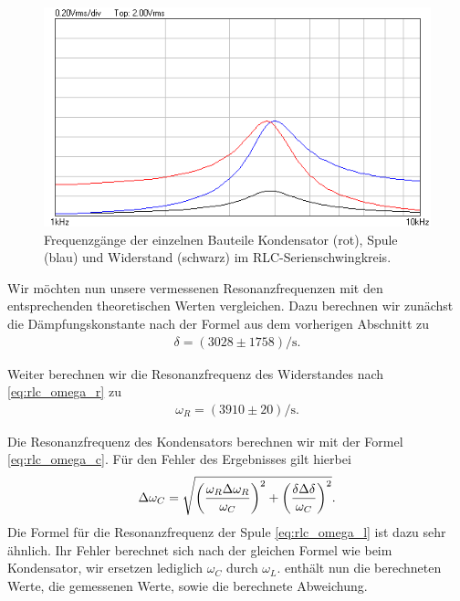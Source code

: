 \begin{figure}[H]
  \centering
  \includegraphics[width=.8\textwidth]{files/aufgabe5_resonanzueberhoehung.png}
  \caption{Frequenzgänge der einzelnen Bauteile Kondensator (rot), Spule (blau) und Widerstand (schwarz) im RLC-Serienschwingkreis.}
  \label{fig:aufgabe5_resonanzueberhoehung}
\end{figure}

Wir möchten nun unsere vermessenen Resonanzfrequenzen mit den entsprechenden theoretischen Werten vergleichen. Dazu berechnen wir zunächst die Dämpfungskonstante nach der Formel aus dem vorherigen Abschnitt zu
\begin{align}
  \delta = (3028 \pm 1758)\si{\per\second}.
\end{align}

Weiter berechnen wir die Resonanzfrequenz des Widerstandes nach \eqref{eq:rlc_omega_r} zu
\begin{align}
  \omega_R = (3910 \pm 20)\si{\per\second}.
\end{align}

Die Resonanzfrequenz des Kondensators berechnen wir mit der Formel \eqref{eq:rlc_omega_c}. Für den Fehler des Ergebnisses gilt hierbei
\begin{align}
  \Delta \omega_C = \sqrt{\qty(\frac{\omega_R \Delta \omega_R}{\omega_C})^2 + \qty(\frac{\delta \Delta \delta}{\omega_C})^2}.
\end{align}
Die Formel für die Resonanzfrequenz der Spule \eqref{eq:rlc_omega_l} ist dazu sehr ähnlich. Ihr Fehler berechnet sich nach der gleichen Formel wie beim Kondensator, wir ersetzen lediglich $\omega_C$ durch $\omega_L$.  enthält nun die berechneten Werte, die gemessenen Werte, sowie die berechnete Abweichung.

